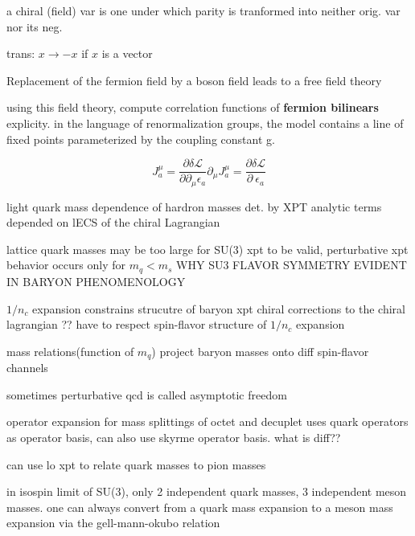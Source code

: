 \documentclass[12pt,tightenlines, raggedbottom, prd, notitlepage]{revtex4-1}
\begin{document}
a chiral (field) var is one under which parity is tranformed into neither orig. var nor its neg. 

trans: $x \rightarrow -x$ if $x$ is a vector


Replacement of the fermion field by a boson field leads to a free field theory 

using this field theory, compute correlation functions of \textbf{fermion bilinears} explicity.
in the language of renormalization groups, the model contains a line of fixed points parameterized by 
the coupling constant g. 

$$
  J^\mu_a = \frac{\partial \delta \mathcal{L}}{\partial \partial_\mu \epsilon_a}
  \partial_{\mu} J^{\mu}_a = \frac{\partial \delta \mathcal{L}}{\partial\ \epsilon_a}
$$

light quark mass dependence of hardron masses det. by XPT 
analytic terms depended on lECS of the chiral Lagrangian

lattice quark masses may be too large for SU(3) xpt to be valid, 
perturbative xpt behavior occurs only for $m_q < m_s$
WHY SU3 FLAVOR SYMMETRY EVIDENT IN BARYON PHENOMENOLOGY

$1/n_c$ expansion constrains strucutre of baryon xpt 
chiral corrections to the chiral lagrangian ?? have to respect spin-flavor structure of $1/n_c$ expansion 

mass relations(function of $m_q$)  project baryon masses onto diff spin-flavor channels 

sometimes perturbative qcd is called asymptotic freedom 

operator expansion for mass splittings of octet and decuplet uses quark operators as operator basis, 
can also use skyrme operator basis. what is diff??


can use lo xpt to relate quark masses to pion masses  

in isospin limit of SU(3), only 2 independent quark masses, 3 independent meson masses.
one can always convert from a quark mass expansion to a meson mass expansion via the gell-mann-okubo relation
\end{document}
